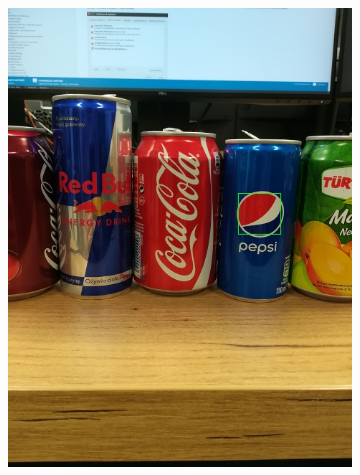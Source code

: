 \documentclass[11pt,a4paper,twoside]{report}
\begin{document}
	\begin{figure}
	    \centering
	    \begin{subfigure}[b]{0.48\textwidth}
	        \includegraphics[width=\textwidth]{img/camera/7}
	    \end{subfigure}
	    ~
	    \begin{subfigure}[b]{0.48\textwidth}

\end{subfigure}
\end{figure}
\end{document}
